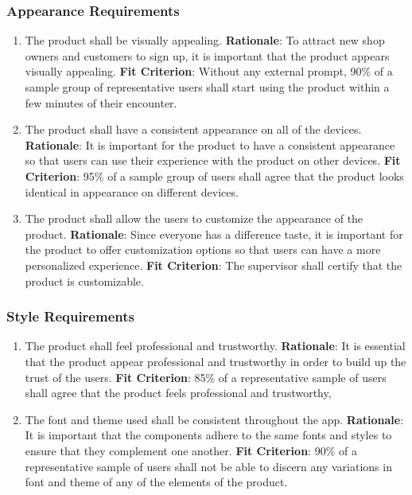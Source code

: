 \documentclass[12pt]{article}
\begin{document}
\subsubsection{Appearance Requirements}
\begin{enumerate}[label = NFR-\arabic*, left=\parindent, series=nfr]
    \item The product shall be visually appealing.
    \newline \textbf{Rationale}: To attract new shop owners and customers to sign up, it is important that the product appears visually appealing. 
    \newline \textbf{Fit Criterion}: Without any external prompt, 90\% of a sample group of representative users shall start using the product within a few minutes of their encounter.
    
    \item The product shall have a consistent appearance on all of the devices.
    \newline \textbf{Rationale}: It is important for the product to have a consistent appearance so that users can use their experience with the product on other devices. 
    \newline \textbf{Fit Criterion}: 95\% of a sample group of users shall agree that the product looks identical in appearance on different devices.

    \item The product shall allow the users to customize the appearance of the product.
    \newline \textbf{Rationale}: Since everyone has a difference taste, it is important for the product to offer customization options so that users can have a more personalized experience. 
    \newline \textbf{Fit Criterion}: The supervisor shall certify that the product is customizable.
\end{enumerate}

\subsubsection{Style Requirements}
\begin{enumerate}[nfr]
    \item The product shall feel professional and trustworthy.
    \newline \textbf{Rationale}: It is essential that the product appear professional and trustworthy in order to build up the trust of the users.
    \newline \textbf{Fit Criterion}: 85\% of a representative sample of users shall agree that the product feels professional and trustworthy, 
    \item The font and theme used shall be consistent throughout the app.
    \newline \textbf{Rationale}: It is important that the components adhere to the same fonts and styles to ensure that they complement one another.
    \newline \textbf{Fit Criterion}: 90\% of a representative sample of users shall not be able to discern any variations in font and theme of any of the elements of the product.
\end{enumerate}
\end{document}
